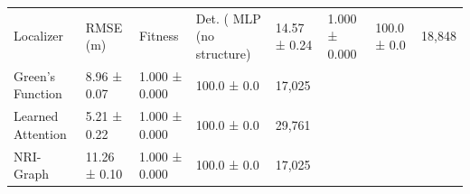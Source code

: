 \begin{tabular}{lllll}
\toprule
Localizer & RMSE (m) & Fitness & Det. (%
\midrule
MLP (no structure) & 14.57 ± 0.24 & 1.000 ± 0.000 & 100.0 ± 0.0 & 18,848 \\
Green's Function & 8.96 ± 0.07 & 1.000 ± 0.000 & 100.0 ± 0.0 & 17,025 \\
Learned Attention & 5.21 ± 0.22 & 1.000 ± 0.000 & 100.0 ± 0.0 & 29,761 \\
NRI-Graph & 11.26 ± 0.10 & 1.000 ± 0.000 & 100.0 ± 0.0 & 17,025 \\
\bottomrule
\end{tabular}
